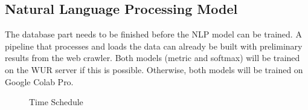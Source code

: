 \documentclass{article}
\begin{document}
\subsection{Natural Language Processing Model}
The database part needs to be finished before the NLP model can be trained.
A pipeline that processes and loads the data can already be built with preliminary results from the web crawler.
Both models (metric and softmax) will be trained on the WUR server if this is possible. 
Otherwise, both models will be trained on Google Colab Pro.


\begin{figure} [t]
    \centering
    \vspace{-2.5cm}
    \hspace{-1.3cm}
    \makebox[\textwidth][c]{}
    \caption{Time Schedule}
    \label{fig:time_schedule}
\end{figure}

\newpage
\printbibliography
\end{document}
